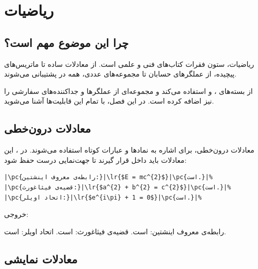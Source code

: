 
\chapter{ریاضیات}
\label{chap:math}

\section{چرا این موضوع مهم است؟}
\label{sec:math-why}

ریاضیات، ستون فقرات کتاب‌های فنی و علمی است.
از معادلات ساده تا ماتریس‌های پیچیده، از
عملگرهای حسابان تا مجموعه‌های عددی، همه در
 پشتیبانی می‌شوند.

 از بسته‌های ،
 و  استفاده
می‌کند و مجموعه‌ای از عملگرها و جداکننده‌های
سفارشی را نیز اضافه کرده است. در این فصل،
با تمام این قابلیت‌ها آشنا می‌شوید.


\section{معادلات درون‌خطی}
\label{sec:math-inline}

معادلات درون‌خطی، برای اشاره به نمادها و
عبارات کوتاه استفاده می‌شوند. در ،
این معادلات باید داخل  قرار گیرند تا
جهت‌نمایی درست حفظ شود:

\begin{latin}
\begin{verbatim}
|\pc{رابطه‌ی معروف اینشتین:}|\lr{$E = mc^{2}$}|\pc{است.}|%
|\pc{قضیه‌ی فیثاغورث:}|\lr{$a^{2} + b^{2} = c^{2}$}|\pc{است.}|%
|\pc{اتحاد اویلر:}|\lr{$e^{i\pi} + 1 = 0$}|\pc{است.}|%
\end{verbatim}
\end{latin}

خروجی:

رابطه‌ی معروف اینشتین:  است.
قضیه‌ی فیثاغورث:  است.
اتحاد اویلر:  است.


\section{معادلات نمایشی}
\label{sec:math-display}

